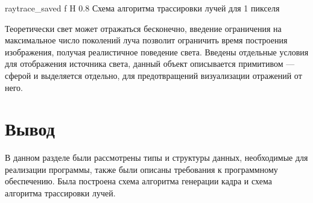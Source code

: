 {raytrace_saved} %
{f} %
{H} %
{0.8\textwidth} %
{Схема алгоритма трассировки лучей для 1 пикселя} %

\newpage
Теоретически свет может отражаться бесконечно, введение ограничения на максимальное число поколений луча позволит ограничить время построения изображения,
получая  реалистичное поведение света. Введены отдельные условия для отображения источника света, данный объект описывается примитивом --- сферой и выделяется отдельно,
для предотвращений визуализации отражений от него.












\section*{Вывод}

В данном разделе были рассмотрены типы и структуры данных, необходимые для реализации программы, также были описаны требования к программному обеспечению. Была построена схема алгоритма генерации кадра и схема алгоритма трассировки лучей.




